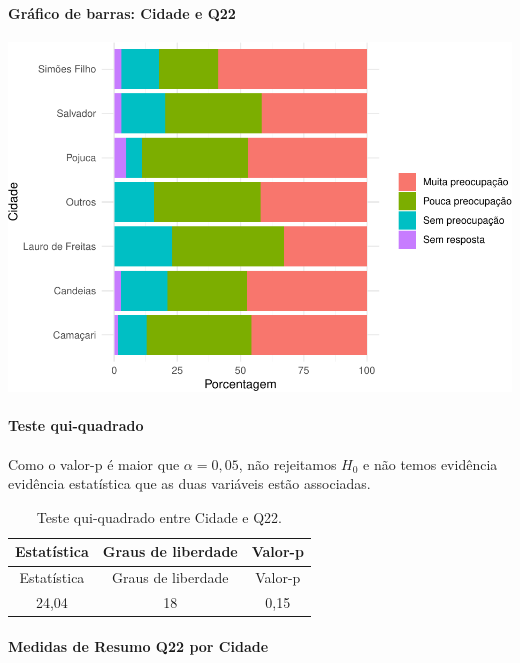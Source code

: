 \documentclass[]{article}
\let\oldparagraph\paragraph
\renewcommand{\paragraph}[1]{\oldparagraph{#1}\mbox{}}
\begin{document}
\hypertarget{gruxe1fico-de-barras-cidade-e-q22}{%
\paragraph{Gráfico de barras: Cidade e Q22}\label{gruxe1fico-de-barras-cidade-e-q22}}

\begin{center}\includegraphics[width=0.75\linewidth]{relatorio_files/figure-latex/unnamed-chunk-365-1} \end{center}

\hypertarget{teste-qui-quadrado-42}{%
\paragraph{Teste qui-quadrado}\label{teste-qui-quadrado-42}}

Como o valor-p é maior que \(\alpha=0,05\), não rejeitamos \(H_0\) e não temos evidência evidência estatística que as duas variáveis estão associadas.

\begin{longtable}[]{@{}ccc@{}}
\caption{\label{tab:unnamed-chunk-366}Teste qui-quadrado entre Cidade e Q22.}\tabularnewline
\toprule
Estatística & Graus de liberdade & Valor-p\tabularnewline
\midrule
\endfirsthead
\toprule
Estatística & Graus de liberdade & Valor-p\tabularnewline
\midrule
\endhead
24,04 & 18 & 0,15\tabularnewline
\bottomrule
\end{longtable}

\cleardoublepage

\hypertarget{medidas-de-resumo-q22-por-cidade}{%
\paragraph{Medidas de Resumo Q22 por Cidade}\label{medidas-de-resumo-q22-por-cidade}}
\end{document}
